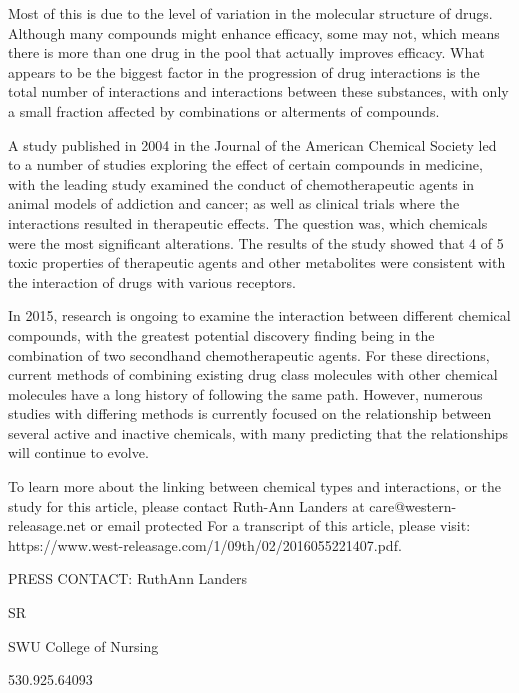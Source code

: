 \documentclass{article}
\begin{document}
Most of this is due to the level of variation in the molecular structure of drugs. Although many compounds might enhance efficacy, some may not, which means there is more than one drug in the pool that actually improves efficacy. What appears to be the biggest factor in the progression of drug interactions is the total number of interactions and interactions between these substances, with only a small fraction affected by combinations or alterments of compounds.

A study published in 2004 in the Journal of the American Chemical Society led to a number of studies exploring the effect of certain compounds in medicine, with the leading study examined the conduct of chemotherapeutic agents in animal models of addiction and cancer; as well as clinical trials where the interactions resulted in therapeutic effects. The question was, which chemicals were the most significant alterations. The results of the study showed that 4 of 5 toxic properties of therapeutic agents and other metabolites were consistent with the interaction of drugs with various receptors.

In 2015, research is ongoing to examine the interaction between different chemical compounds, with the greatest potential discovery finding being in the combination of two secondhand chemotherapeutic agents. For these directions, current methods of combining existing drug class molecules with other chemical molecules have a long history of following the same path. However, numerous studies with differing methods is currently focused on the relationship between several active and inactive chemicals, with many predicting that the relationships will continue to evolve.

To learn more about the linking between chemical types and interactions, or the study for this article, please contact Ruth-Ann Landers at care@western-releasage.net or email protected For a transcript of this article, please visit: https://www.west-releasage.com/1/09th/02/2016055221407.pdf.

PRESS CONTACT: RuthAnn Landers

SR

SWU College of Nursing

530.925.64093
\end{document}
